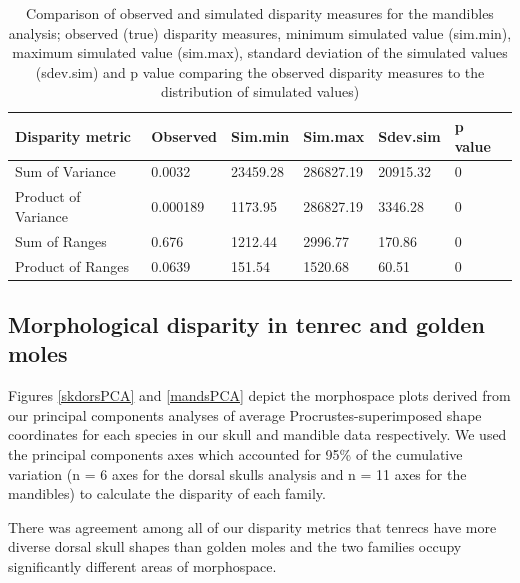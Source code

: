 \documentclass[12pt,a4paper]{article}
\begin{document}
\begin{table}[H]				

\centering
\caption{Comparison of observed and simulated disparity measures for the mandibles analysis; observed (true) disparity measures, minimum simulated value (sim.min), maximum simulated value (sim.max), standard deviation of the simulated values (sdev.sim) and p value comparing the observed disparity measures to the distribution of simulated values)}

\begin{tabular}[t]{l l l l l l }		%
\hline
\textbf{Disparity metric} & \textbf{Observed} & \textbf{Sim.min} & \textbf{Sim.max} & \textbf{Sdev.sim} & \textbf{p value} \\
\hline
Sum of Variance & 0.0032 & 23459.28 & 286827.19 & 20915.32 &	0\\
Product of Variance	& 0.000189 & 1173.95 &	286827.19 &	3346.28 & 0\\
Sum of Ranges &	0.676 &	1212.44 &	2996.77 &	170.86 & 0 \\
Product of Ranges & 0.0639 & 151.54 & 1520.68 &	60.51 &	0\\
\hline
\end{tabular}
\label{mandssims}
\end{table}

\subsection{Morphological disparity in tenrec and golden moles} %

Figures  \ref{skdorsPCA} and \ref{mandsPCA} depict the morphospace plots derived from our principal components analyses of average Procrustes-superimposed shape coordinates for each species in our skull and mandible data respectively. We used the principal components axes which accounted for 95\% of the cumulative variation (n = 6 axes for the dorsal skulls analysis and n = 11 axes for the mandibles) to calculate the disparity of each family. 

There was agreement among all of our disparity metrics that tenrecs have more diverse dorsal skull shapes than golden moles
and the two families occupy significantly different areas of morphospace.
\end{document}
